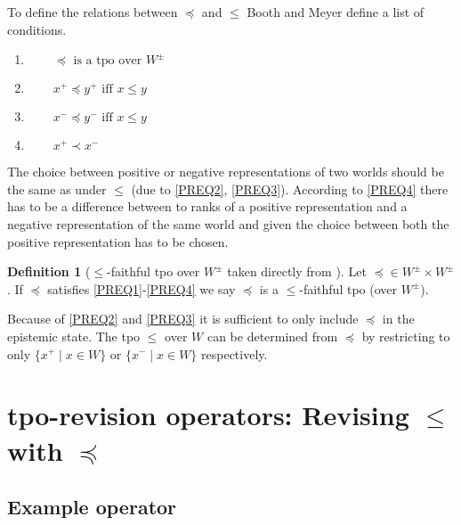 \documentclass[11pt]{scrartcl}
\theoremstyle{definition}
\theoremstyle{definition}
\newtheorem{definition}{Definition}[section]
\begin{document}
To define the relations between $\preceq$ and $\leq$ Booth and Meyer define a list of conditions.

\begin{enumerate}[wide=0pt, widest=99,leftmargin=\parindent,label = ($\preceq\arabic*$)]
    \item\label{PREQ1} $\qquad \preceq \textrm{ is a tpo over } W^{\pm}$
    \item\label{PREQ2} $\qquad x^{+} \preceq y^{+} \textrm{ iff } x \leq y$
    \item\label{PREQ3} $\qquad x^{-} \preceq y^{-} \textrm{ iff } x \leq y$
    \item\label{PREQ4} $\qquad x^{+} \prec x^{-}$
\end{enumerate}

The choice between positive or negative representations of two worlds should be the same as under $\leq$ (due to \ref{PREQ2}, \ref{PREQ3}). According to \ref{PREQ4} there has to be a difference between to ranks of a positive representation and a negative representation of the same world and given the choice between both the positive representation has to be chosen.

\begin{definition}[$\leq$-faithful tpo over $W^{\pm}$ taken directly from \cite{Booth2011}]
Let $\preceq \in W^{\pm} \times W^{\pm}$. If $\preceq$ satisfies \ref{PREQ1}-\ref{PREQ4} we say $\preceq$ is a $\leq$-faithful tpo (over $W^{\pm}$).
\end{definition}

Because of \ref{PREQ2} and \ref{PREQ3} it is sufficient to only include $\preceq$ in the epistemic state. The tpo $\leq$ over $W$ can be determined from $\preceq$ by restricting to only $\{ x^{+} \mid x \in W\}$ or $\{ x^{-} \mid x \in W\}$ respectively.

\section{tpo-revision operators: Revising $\leq$ with $\preceq$}
\subsection{Example operator}
\end{document}
